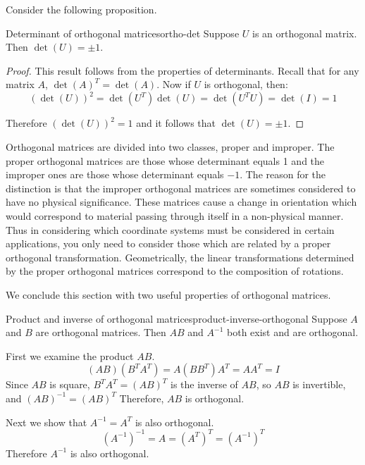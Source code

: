 Consider the following proposition.

\begin{proposition}{Determinant of orthogonal matrices}{ortho-det}
Suppose $U$ is an orthogonal matrix. Then $\det (U) = \pm 1$. 
\end{proposition}

\begin{proof}
This result follows from the properties of determinants. Recall that
for any matrix $A$, $\det(A)^T = \det(A)$. Now if $U$ is orthogonal, then:
\begin{equation*}
(\det (U)) ^{2}=\det (U^{T}) \det (U)
=\det (U^{T}U) =\det (I) =1
\end{equation*}

Therefore $(\det (U))^2 = 1$ and it follows that $\det (U) = \pm 1$. 
\end{proof}

Orthogonal matrices are divided into two classes, proper and improper.
The proper orthogonal matrices are those whose determinant equals 1
and the improper ones are those whose determinant equals $-1$. The
reason for the distinction is that the improper orthogonal matrices
are sometimes considered to have no physical significance. These
matrices cause a change in orientation which would correspond to
material passing through itself in a non-physical manner. Thus in
considering which coordinate systems must be considered in certain
applications, you only need to consider those which are related by a
proper orthogonal transformation. Geometrically, the linear
transformations determined by the proper orthogonal matrices
correspond to the composition of rotations.

We conclude this section with two useful properties of orthogonal matrices. 

\begin{example}{Product and inverse of orthogonal matrices}{product-inverse-orthogonal}
Suppose $A$ and $B$ are orthogonal matrices. Then $AB$ and $A^{-1}$ both exist and are orthogonal.
\end{example}

\begin{solution}
First we examine the product $AB$. 
\[ (AB)(B^TA^T)=A(BB^T)A^T =AA^T=I \]
Since $AB$ is square, $B^TA^T=(AB)^T$ is the inverse of
$AB$, so $AB$ is invertible, and $(AB)^{-1}=(AB)^T$
Therefore, $AB$ is orthogonal.

Next we show that $A^{-1}=A^T$ is also orthogonal. 
\[ (A^{-1})^{-1} = A = (A^T)^{T}
=(A^{-1})^{T} \]
Therefore $A^{-1}$ is also orthogonal.
\end{solution}
